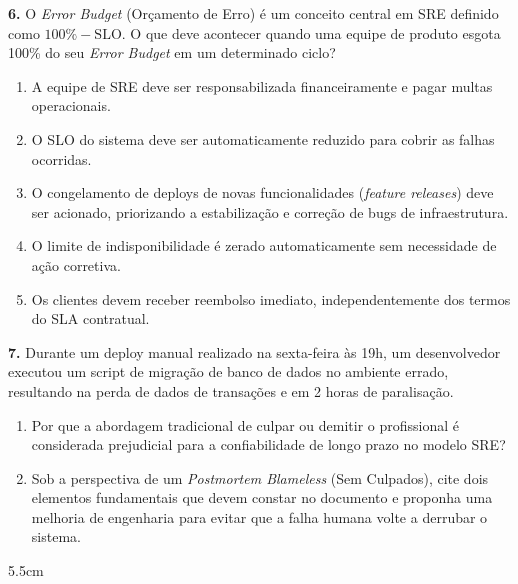 \documentclass[12pt]{article}
\begin{document}
\vspace{0.4cm}

\textbf{6.} O \textit{Error Budget} (Orçamento de Erro) é um conceito central em SRE definido como $100\% - \text{SLO}$. O que deve acontecer quando uma equipe de produto esgota 100\% do seu \textit{Error Budget} em um determinado ciclo?
\begin{enumerate}[label=\alph*)]
    \item A equipe de SRE deve ser responsabilizada financeiramente e pagar multas operacionais.
    \item O SLO do sistema deve ser automaticamente reduzido para cobrir as falhas ocorridas.
    \item O congelamento de deploys de novas funcionalidades (\textit{feature releases}) deve ser acionado, priorizando a estabilização e correção de bugs de infraestrutura.
    \item O limite de indisponibilidade é zerado automaticamente sem necessidade de ação corretiva.
    \item Os clientes devem receber reembolso imediato, independentemente dos termos do SLA contratual.
\end{enumerate}

\vspace{0.4cm}

\textbf{7.} Durante um deploy manual realizado na sexta-feira às 19h, um desenvolvedor executou um script de migração de banco de dados no ambiente errado, resultando na perda de dados de transações e em 2 horas de paralisação.
\begin{enumerate}[label=\alph*)]
    \item Por que a abordagem tradicional de culpar ou demitir o profissional é considerada prejudicial para a confiabilidade de longo prazo no modelo SRE?
    \item Sob a perspectiva de um \textit{Postmortem Blameless} (Sem Culpados), cite dois elementos fundamentais que devem constar no documento e proponha uma melhoria de engenharia para evitar que a falha humana volte a derrubar o sistema.
\end{enumerate}
\begin{resposta}{5.5cm}
\end{resposta}

\vspace{0.4cm}
\end{document}
